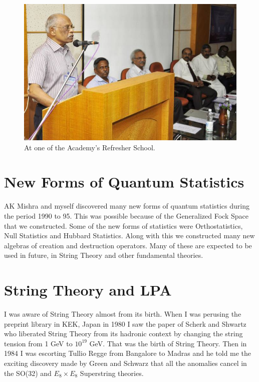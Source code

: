 \begin{figure}[h]
\centering
\includegraphics[width=\textwidth]{images/Rajaji-outreach-1.jpg}
\caption{At one of the Academy's Refresher School.}
\end{figure}
     
\section*{New Forms of Quantum Statistics}

AK Mishra and myself discovered many new forms of quantum statistics during
the period 1990 to 95. This was possible because of the Generalized Fock Space
that we constructed. Some of the new forms of statistics were Orthostatistics, 
Null Statistics and Hubbard Statistics. Along with this we constructed many
new algebras of creation and destruction operators. Many of these are expected
to be used in future, in String Theory and other fundamental theories.

\section*{String Theory and LPA}

I was aware of String Theory almost from its birth. When I was perusing 
the preprint library in KEK, Japan in 1980 I saw the paper of Scherk and 
Shwartz who liberated String Theory from its hadronic context by 
changing the string tension from 1 GeV to $10^{19}$ GeV. That was the birth 
of String Theory. Then in 1984 I was escorting Tullio Regge from 
Bangalore to Madras and he told me the exciting discovery made by Green 
and Schwarz that all the anomalies cancel in the SO(32) and $E_8 \times E_8$ 
Superstring theories.

